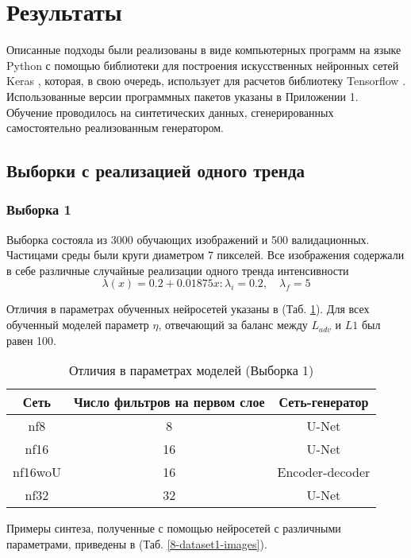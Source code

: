 \section{Результаты}
	Описанные подходы были реализованы в виде компьютерных программ на языке Python с помощью библиотеки для построения искусственных нейронных сетей Keras \cite{keras}, которая, в свою очередь, использует для расчетов библиотеку Tensorflow \cite{tf}. Использованные версии программных пакетов указаны в Приложении 1. Обучение проводилось на синтетических данных, сгенерированных самостоятельно реализованным генератором. 
	\subsection{Выборки с реализацией одного тренда}
		\subsubsection{Выборка 1}
			Выборка состояла из 3000 обучающих изображений и 500 валидационных. Частицами среды были круги диаметром 7 пикселей. Все изображения содержали в себе различные случайные реализации одного тренда интенсивности
			$$\lambda(x) = 0.2 + 0.01875x : \lambda_i = 0.2, \quad \lambda_f = 5$$
			
			Отличия в параметрах обученных нейросетей указаны в (Таб. \ref{8-sand-trend2-nns}). Для всех обученный моделей параметр $\eta$, отвечающий за баланс между $L_{adv}$ и $L1$ был равен 100.
			
			\begin{table}[h!]
				\begin{center}
					\begin{tabular}{|c|c|c|}
						\hline
						Сеть & Число фильтров на первом слое & Сеть-генератор \\
						\hline
						nf8 & 8 & U-Net \\
						\hline
						nf16 & 16 & U-Net \\
						\hline
						nf16woU & 16 & Encoder-decoder \\
						\hline
						nf32 & 32 & U-Net \\
						\hline
					\end{tabular}
					\caption{Отличия в параметрах моделей (Выборка 1)}
					\label{8-sand-trend2-nns}
				\end{center}
			\end{table}
			
			Примеры синтеза, полученные с помощью нейросетей с различными параметрами, приведены в (Таб. \ref{8-dataset1-images}).
			
